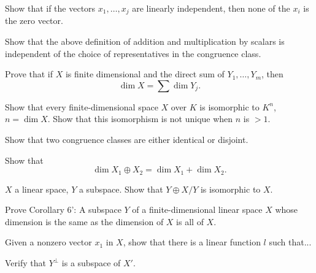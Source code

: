   \begin{exercise}[Lax 1.10] 
    Show that if the vectors $x_1,\ldots,x_j$ are linearly independent, then none of the $x_i$ is the zero vector.
  \end{exercise}

  \begin{exercise}[Lax 1.15] 
    Show that the above definition of addition and multiplication by scalars is independent of the choice of representatives in the congruence class.
  \end{exercise}

  \begin{exercise}[Lax 1.11] 
    Prove that if $X$ is finite dimensional and the direct sum of $Y_1,\ldots,Y_m$, then
    \[ \dim X = \sum \dim Y_j. \]
  \end{exercise}

  \begin{exercise}[Lax 1.12] 
    Show that every finite-dimensional space $X$ over $K$ is isomorphic to $K^n$, $n = \dim X$. Show that this isomorphism is not unique when $n$ is $>1$.
  \end{exercise}

  \begin{exercise}[Lax 1.14] 
    Show that two congruence classes are either identical or disjoint.
  \end{exercise}

  \begin{exercise}[Lax 1.18] 
    Show that
    \[ \dim X_1 \oplus X_2 = \dim X_1 + \dim X_2. \]
  \end{exercise}

  \begin{exercise}[Lax 1.19] 
    $X$ a linear space, $Y$ a subspace. Show that $Y \oplus X/Y$ is isomorphic to $X$.
  \end{exercise}

  \begin{exercise}[Lax 1.17] 
    Prove Corollary 6': A subspace $Y$ of a finite-dimensional linear space $X$ whose dimension is the same as the dimension of $X$ is all of $X$.
  \end{exercise}

  \begin{exercise}[Lax 2.1] 
    Given a nonzero vector $x_1$ in $X$, show that there is a linear function $l$ such that...
  \end{exercise}

  \begin{exercise}[Lax 2.2] 
    Verify that $Y^\perp$ is a subspace of $X'$.
  \end{exercise}

